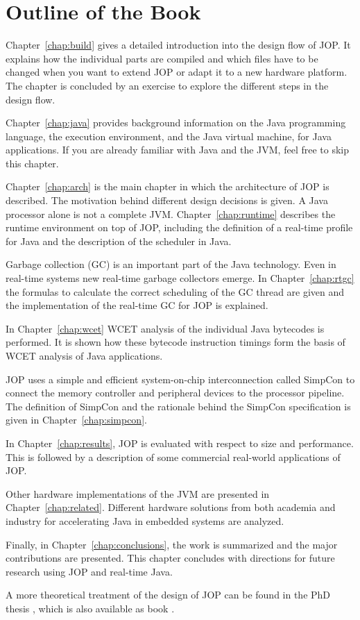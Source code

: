 \section{Outline of the Book}

Chapter~\ref{chap:build} gives a detailed introduction into the
design flow of JOP. It explains how the individual parts are compiled
and which files have to be changed when you want to extend JOP or
adapt it to a new hardware platform. The chapter is concluded by an
exercise to explore the different steps in the design flow.

Chapter~\ref{chap:java} provides background information on the Java
programming language, the execution environment, and the Java virtual
machine, for Java applications. If you are already familiar with Java
and the JVM, feel free to skip this chapter.

Chapter~\ref{chap:arch} is the main chapter in which the architecture
of JOP is described. The motivation behind different design decisions
is given. A Java processor alone is not a complete JVM.
Chapter~\ref{chap:runtime} describes the runtime environment on top
of JOP, including the definition of a real-time profile for Java and
the description of the scheduler in Java.

Garbage collection (GC) is an important part of the Java technology.
Even in real-time systems new real-time garbage collectors emerge.
In Chapter~\ref{chap:rtgc} the formulas to calculate the correct
scheduling of the GC thread are given and the implementation of the
real-time GC for JOP is explained.

In Chapter~\ref{chap:wcet} WCET analysis of the individual Java
bytecodes is performed. It is shown how these bytecode instruction
timings form the basis of WCET analysis of Java applications.

JOP uses a simple and efficient system-on-chip interconnection
called SimpCon to connect the memory controller and peripheral
devices to the processor pipeline. The definition of SimpCon and the
rationale behind the SimpCon specification is given in
Chapter~\ref{chap:simpcon}.


In Chapter~\ref{chap:results}, JOP is evaluated with respect to size
and performance. This is followed by a description of some
commercial real-world applications of JOP.

Other hardware implementations of the JVM are presented in
Chapter~\ref{chap:related}. Different hardware solutions from both
academia and industry for accelerating Java in embedded systems are
analyzed.

Finally, in Chapter~\ref{chap:conclusions}, the work is summarized
and the major contributions are presented. This chapter concludes
with directions for future research using JOP and real-time Java.

A more theoretical treatment of the design of JOP can be found in the
PhD thesis \cite{jop:thesis}, which is also available as book
\cite{jop:thesis:book}.
